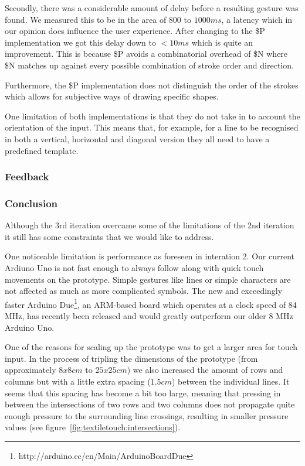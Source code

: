 Secondly, there was a considerable amount of delay before a resulting gesture was found.
We measured this to be in the area of \(800\) to \(1000 ms\), a latency which in our opinion does influence the user experience.
After changing to the \$P implementation we got this delay down to \(< 10 ms\) which is quite an improvement.
This is because \$P avoids a combinatorial overhead of \$N where \$N matches up against every possible combination of stroke order and direction.

Furthermore, the \$P implementation does not distinguish the order of the strokes which allows for subjective ways of drawing specific shapes.

One limitation of both implementations is that they do not take in to account the orientation of the input. 
This means that, for example, for a line to be recognised in both a vertical, horizontal and diagonal version they all need to have a predefined template. 

\subsubsection{Feedback} 

\subsubsection{Conclusion} 

Although the 3rd iteration overcame some of the limitations of the 2nd iteration it still has some constraints that we would like to address.

One noticeable limitation is performance as foreseen in interation 2.
Our current Ardiuno Uno is not fast enough to always follow along with quick touch movements on the prototype.
Simple gestures like lines or simple characters are not affected as much as more complicated symbols.
The new and exceedingly faster Arduino Due\footnote{http://arduino.cc/en/Main/ArduinoBoardDue}, an ARM-based board which operates at a clock speed of 84 MHz, has recently been released and would greatly outperform our older 8 MHz Arduino Uno.

One of the reasons for scaling up the prototype was to get a larger area for touch input.
In the process of tripling the dimensions of the prototype (from approximately \(8x8cm\) to \(25x25cm\)) we also increased the amount of rows and columns but with a little extra spacing (\(1.5cm\)) between the individual lines.
It seems that this spacing has become a bit too large, meaning that pressing in between the intersections of two rows and two columns does not propagate quite enough pressure to the surrounding line crossings, resulting in smaller pressure values (see figure~\ref{fig:textiletouch:intersections}).

